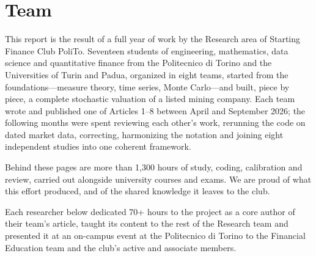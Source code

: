 \chapter*{Team}

\noindent
This report is the result of a full year of work by the Research area of
Starting Finance Club PoliTo. Seventeen students of engineering, mathematics,
data science and quantitative finance from the Politecnico di Torino and the
Universities of Turin and Padua, organized in eight teams, started from the
foundations---measure theory, time series, Monte Carlo---and built, piece by
piece, a complete stochastic valuation of a listed mining company. Each team
wrote and published one of Articles 1--8 between April and September 2026;
the following months were spent reviewing each other's work, rerunning the
code on dated market data, correcting, harmonizing the notation and joining
eight independent studies into one coherent framework.

\smallskip\noindent
Behind these pages are more than 1,300 hours of study, coding, calibration and
review, carried out alongside university courses and exams. We are proud of
what this effort produced, and of the shared knowledge it leaves to the club.

\medskip
{}\par\smallskip
\noindent
Each researcher below dedicated 70+ hours to the project as a core author of
their team's article, taught its content to the rest of the Research team and
presented it at an on-campus event at the Politecnico di Torino to the
Financial Education team and the club's active and associate members.

